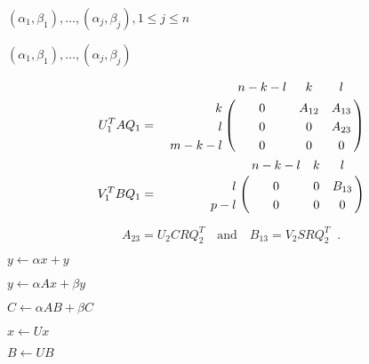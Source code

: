 {\newpage\clearpage
{}%
$(\alpha_1,\beta_1),\ldots,(\alpha_j,\beta_j),
1 \leq j \leq n$%
\lthtmlinlinemathZ
\lthtmlcheckvsize\clearpage}

{\newpage\clearpage
{}%
$(\alpha_1,\beta_1),\ldots, (\alpha_j,\beta_j)$%
\lthtmlinlinemathZ
\lthtmlcheckvsize\clearpage}

{\newpage\clearpage
{}%
\begin{eqnarray*}
U^T_1 A Q_1 & = & \bordermatrix{    &   n-k-l   & k   &  l   \cr
                 \hfill  k  & 0         & A_{12}  & A_{13}  \cr
                 \hfill  l  & 0         &  0      & A_{23}   \cr
                         m-k-l & 0      & 0       & 0       } \\
V^T_1 B Q_1 & = & \bordermatrix{    &   n-k-l   & k   &  l   \cr
                 \hfill  l  & 0         & 0       & B_{13}  \cr
                        p-l & 0         &  0      & 0 }
\end{eqnarray*}%
\lthtmldisplayZ
\lthtmlcheckvsize\clearpage}

{\newpage\clearpage
{}%
\begin{displaymath}
 A_{23} =  U_2 C R Q^T_2  \quad  \mbox{and} \quad
 B_{13} =  V_2 S R Q^T_2  \; \; .
\end{displaymath}%
\lthtmldisplayZ
\lthtmlcheckvsize\clearpage}

{\newpage\clearpage
{}%
$y \leftarrow \alpha x + y$%
\lthtmlinlinemathZ
\lthtmlcheckvsize\clearpage}

{\newpage\clearpage
{}%
$y \leftarrow \alpha A x + \beta y$%
\lthtmlinlinemathZ
\lthtmlcheckvsize\clearpage}

{\newpage\clearpage
{}%
$C \leftarrow \alpha A B + \beta C$%
\lthtmlinlinemathZ
\lthtmlcheckvsize\clearpage}

{\newpage\clearpage
{}%
$x \leftarrow U x$%
\lthtmlinlinemathZ
\lthtmlcheckvsize\clearpage}

{\newpage\clearpage
{}%
$B \leftarrow U B$%
\lthtmlinlinemathZ
\lthtmlcheckvsize\clearpage}

